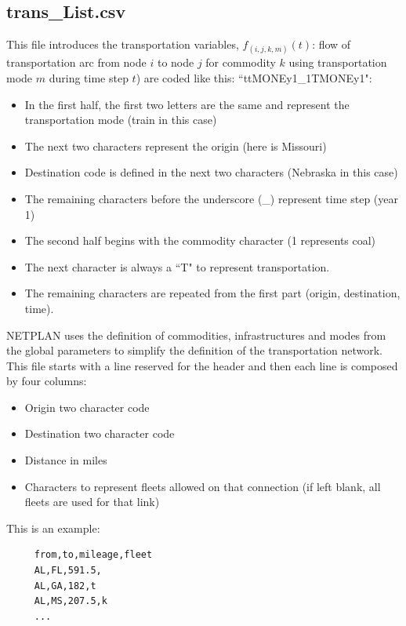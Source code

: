 \documentclass{article}
\begin{document}
\subsection{trans\_List.csv}

This file introduces the transportation variables, $f_{(i,j,k,m)}(t)$: flow of transportation arc from node $i$ to node $j$ for commodity $k$ using transportation mode $m$ during time step $t$) are coded like this: ``ttMONEy1\_1TMONEy1":

\begin{itemize}
  \item In the first half, the first two letters are the same and represent the transportation mode (train in this case)
  \item The next two characters represent the origin (here is Missouri)
  \item Destination code is defined in the next two characters (Nebraska in this case)
  \item The remaining characters before the underscore (\_) represent time step (year 1)
  \item The second half begins with the commodity character (1 represents coal)
  \item The next character is always a ``T" to represent transportation.
  \item The remaining characters are repeated from the first part (origin, destination, time).
\end{itemize}

NETPLAN uses the definition of commodities, infrastructures and modes from the global parameters to simplify the definition of the transportation network. This file starts with a line reserved for the header and then each line is composed by four columns:

\begin{itemize}
  \item Origin two character code
  \item Destination two character code
  \item Distance in miles
  \item Characters to represent fleets allowed on that connection (if left blank, all fleets are used for that link)
\end{itemize}

This is an example:

\begin{verbatim}
     from,to,mileage,fleet
     AL,FL,591.5,
     AL,GA,182,t
     AL,MS,207.5,k
     ...
\end{verbatim}
\end{document}

